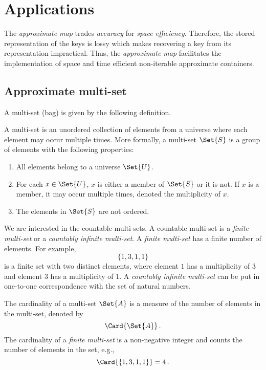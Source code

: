 \documentclass[ ../main.tex]{subfiles}
\begin{document}
\section{Applications}
The \emph{approximate map} trades \emph{accuracy} for \emph{space efficiency}. Therefore, the stored representation of the keys is lossy which makes recovering a key from its representation impractical. Thus, the \emph{approximate map} facilitates the implementation of space and time efficient non-iterable approximate containers.

\subsection{Approximate multi-set}
A multi-set (bag) is given by the following definition.
\begin{definition}
A multi-set is an unordered collection of elements from a universe where each element may occur multiple times. More formally, a multi-set $\Set{S}$ is a group of elements with the following properties:
\begin{enumerate}
    \item All elements belong to a universe $\Set{U}$.
    \item For each $x \in \Set{U}$, $x$ is either a member of $\Set{S}$ or it is not. If $x$ is a member, it may occur multiple times, denoted the multiplicity of $x$.
    \item The elements in $\Set{S}$ are not ordered.
\end{enumerate}
\end{definition}
We are interested in the countable multi-sets. A countable multi-set is a \emph{finite multi-set} or a \emph{countably infinite multi-set}. A \emph{finite multi-set} has a finite number of elements. For example,
\[
    \{ 1, 3, 1, 1 \}
\]
is a finite set with two distinct elements, where element $1$ has a multiplicity of $3$ and element $3$ has a multiplicity of $1$. A \emph{countably infinite multi-set} can be put in one-to-one correspondence with the set of natural numbers.

The cardinality of a multi-set $\Set{A}$ is a measure of the number of elements in the multi-set, denoted by
\begin{equation}
    \Card{\Set{A}}\,.
\end{equation}
The cardinality of a \emph{finite multi-set} is a non-negative integer and counts the number of elements in the set, e.g.,
\[
    \Card{\left\{ 1, 3, 1, 1\right\}} = 4\,.
\]
\end{document}
